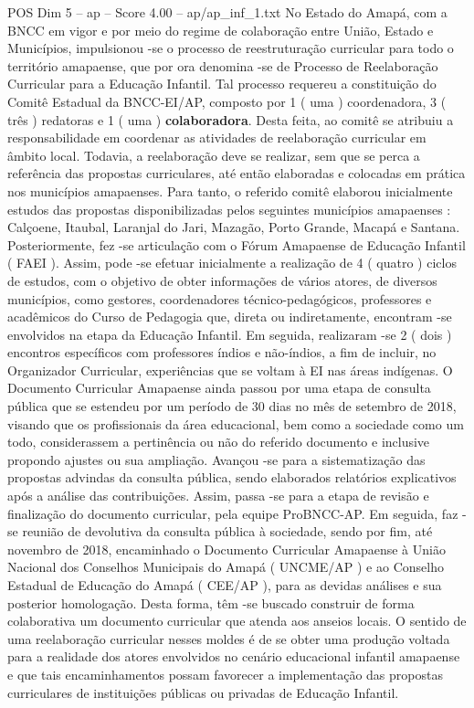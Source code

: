 \begin{textsample}{POS Dim 5 – ap – Score 4.00 – ap/ap\_inf\_1.txt}
No Estado do Amapá, com a BNCC em vigor e por meio do regime de colaboração entre União, Estado e Municípios, impulsionou -se o processo de reestruturação curricular para todo o território amapaense, que por ora denomina -se de Processo de Reelaboração Curricular para a Educação Infantil.
Tal processo requereu a constituição do Comitê Estadual da BNCC-EI/AP, composto por 1 ( uma ) coordenadora, 3 ( três ) redatoras e 1 ( uma ) \textbf{colaboradora}.
Desta feita, ao comitê se atribuiu a responsabilidade em coordenar as atividades de reelaboração curricular em âmbito local.
Todavia, a reelaboração deve se realizar, sem que se perca a referência das propostas curriculares, até então elaboradas e colocadas em prática nos municípios amapaenses.
Para tanto, o referido comitê elaborou inicialmente estudos das propostas disponibilizadas pelos seguintes municípios amapaenses : Calçoene, Itaubal, Laranjal do Jari, Mazagão, Porto Grande, Macapá e Santana.
Posteriormente, fez -se articulação com o Fórum Amapaense de Educação Infantil ( FAEI ).
Assim, pode -se efetuar inicialmente a realização de 4 ( quatro ) ciclos de estudos, com o objetivo de obter informações de vários atores, de diversos municípios, como gestores, coordenadores técnico-pedagógicos, professores e acadêmicos do Curso de Pedagogia que, direta ou indiretamente, encontram -se envolvidos na etapa da Educação Infantil.
Em seguida, realizaram -se 2 ( dois ) encontros específicos com professores índios e não-índios, a fim de incluir, no Organizador Curricular, experiências que se voltam à EI nas áreas indígenas.
O Documento Curricular Amapaense ainda passou por uma etapa de consulta pública que se estendeu por um período de 30 dias no mês de setembro de 2018, visando que os profissionais da área educacional, bem como a sociedade como um todo, considerassem a pertinência ou não do referido documento e inclusive propondo ajustes ou sua ampliação.
Avançou -se para a sistematização das propostas advindas da consulta pública, sendo elaborados relatórios explicativos após a análise das contribuições.
Assim, passa -se para a etapa de revisão e finalização do documento curricular, pela equipe ProBNCC-AP.
Em seguida, faz -se reunião de devolutiva da consulta pública à sociedade, sendo por fim, até novembro de 2018, encaminhado o Documento Curricular Amapaense à União Nacional dos Conselhos Municipais do Amapá ( UNCME/AP ) e ao Conselho Estadual de Educação do Amapá ( CEE/AP ), para as devidas análises e sua posterior homologação.
Desta forma, têm -se buscado construir de forma colaborativa um documento curricular que atenda aos anseios locais.
O sentido de uma reelaboração curricular nesses moldes é de se obter uma produção voltada para a realidade dos atores envolvidos no cenário educacional infantil amapaense e que tais encaminhamentos possam favorecer a implementação das propostas curriculares de instituições públicas ou privadas de Educação Infantil.

\end{textsample}
